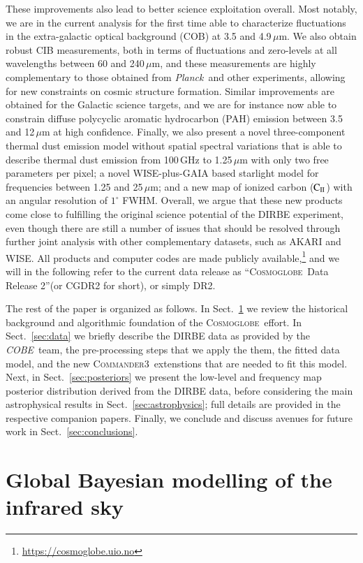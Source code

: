 \documentclass{aa}
\def\Cosmoglobe{\textsc{Cosmoglobe}}
\def\commanderthree{\textsc{Commander3}}
\def\Planck{\textit{Planck}}
\def\COBE{\textit{COBE}}
\newcommand{\CII}{$\mathrm{C}_{\textsc{II}}$}
\begin{document}
These improvements also lead to better science exploitation overall. Most notably, we are in the current analysis for the first time able to characterize fluctuations in the extra-galactic optical background (COB) at 3.5 and 4.9$\,\mu$m. We also obtain robust CIB measurements, both in terms of fluctuations and zero-levels at all wavelengths between 60 and 240$\,\mu$m, and these measurements are highly complementary to those obtained from \Planck\ and other experiments, allowing for new constraints on cosmic structure formation. Similar improvements are obtained for the Galactic science targets, and we are for instance now able to constrain diffuse polycyclic aromatic hydrocarbon (PAH) emission between 3.5 and 12$\,\mu$m at high confidence. Finally, we also present a novel three-component thermal dust emission model without spatial spectral variations that is able to describe thermal dust emission from 100\,GHz to 1.25$\,\mu$m with only two free parameters per pixel; a novel WISE-plus-GAIA based starlight model for frequencies between 1.25 and 25$\,\mu$m; and a new map of ionized carbon (\CII) with an angular resolution of $1^{\circ}$ FWHM. Overall, we argue that these new products come close to fulfilling the original science potential of the DIRBE experiment, even though there are still a number of issues that should be resolved through further joint analysis with other complementary datasets, such as AKARI and WISE. All products and computer codes are made publicly available,\footnote{\url{https://cosmoglobe.uio.no}} and we will in the following refer to the current data release as ``\Cosmoglobe\ Data Release 2''(or CGDR2 for short), or simply DR2.

The rest of the paper is organized as follows. In Sect.~\ref{sec:global_modelling} we review the historical background and algorithmic foundation of the \Cosmoglobe\ effort. In Sect.~\ref{sec:data} we briefly describe the DIRBE data as provided by the \COBE\ team, the pre-processing steps that we apply the them, the fitted data model, and the new \commanderthree\ extenstions that are needed to fit this model. Next, in Sect.~\ref{sec:posteriors} we present the low-level and frequency map posterior distribution derived from the DIRBE data,  before considering the main astrophysical results in Sect.~\ref{sec:astrophysics}; full details are provided in the respective companion papers. Finally, we conclude and discuss avenues for future work in Sect.~\ref{sec:conclusions}.


\section{Global Bayesian modelling of the infrared sky}
\label{sec:global_modelling}
\end{document}

